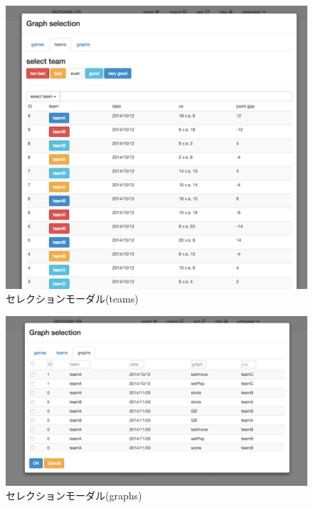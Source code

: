 \documentclass[sotsuron]{kuee}
\begin{document}
			\begin{figure}
				\begin{center}
					\includegraphics[width=\linewidth]{./png/selection_teams.png}
				\end{center}
				\caption{セレクションモーダル(teams)}
		  		\label{fig:selection_teams}
			\end{figure}
			\begin{figure}
				\begin{center}
					\includegraphics[width=\linewidth]{./png/selection_graphs.png}
				\end{center}
				\caption{セレクションモーダル(graphs)}
		  		\label{fig:selection_graphs}
			\end{figure}
		
\end{document}
